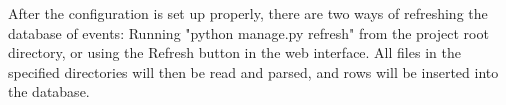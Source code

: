 After the configuration is set up properly, there are two ways of refreshing the database of events: Running "python manage.py refresh" from the project root directory, or using the Refresh button in the web interface. All files in the specified directories will then be read and parsed, and rows will be inserted into the database. 
